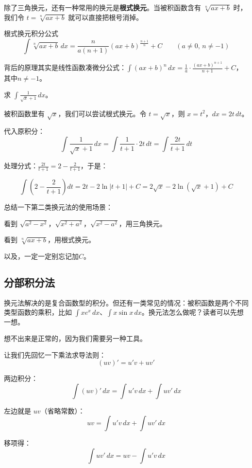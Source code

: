 除了三角换元，还有一种常用的换元是\textbf{根式换元}。当被积函数含有 $\sqrt[n]{ax+b}$ 时，我们令 $t = \sqrt[n]{ax+b}$ 就可以直接把根号消掉。

\begin{theorem}{根式换元积分公式}{}
  \[
\int \sqrt[n]{ax+b}\,dx = \frac{n}{a(n+1)}(ax+b)^{\frac{n+1}{n}} + C \qquad (a\neq 0,\, n\neq -1)
\]
\end{theorem}

背后的原理其实是线性函数凑微分公式：$\int (ax+b)^n \,dx = \frac{1}{a}\cdot\frac{(ax+b)^{n+1}}{n+1}+C$，其中$n\neq -1 $。

\begin{myexample}
  求 $\int \frac{1}{\sqrt{x} + 1}\, dx$。

  被积函数里有 $\sqrt{x}$，我们可以尝试根式换元。令 $t = \sqrt{x}$，则 $x = t^2$，$dx = 2t\, dt$。

  代入原积分：
  \[
  \int \frac{1}{\sqrt{x} + 1}\, dx = \int \frac{1}{t + 1} \cdot 2t\, dt = \int \frac{2t}{t+1}\, dt
  \]

  处理分式：$\frac{2t}{t+1} = 2 - \frac{2}{t+1}$，于是：

  \[
  \int (2 - \frac{2}{t+1}) dt = 2t - 2\ln|t+1| + C = 2\sqrt{x} - 2\ln(\sqrt{x}+1) + C
  \]

\end{myexample}

总结一下第二类换元法的使用场景：

看到 $\sqrt{a^2 - x^2}$，$\sqrt{x^2 + a^2}$，$\sqrt{x^2 - a^2}$，用三角换元。


看到 $\sqrt[n]{ax+b}$，用根式换元。


以及，一定一定别忘记加$C$。


\subsection{分部积分法}

换元法解决的是复合函数型的积分。但还有一类常见的情况：被积函数是两个不同类型函数的乘积，比如 $\int x e^x\,dx$、$\int x \sin x\,dx$。换元法怎么做呢？读者可以先想一想。

想不出来是正常的，因为我们需要另一种工具。

让我们先回忆一下乘法求导法则：
\[
(uv)' = u'v + uv'
\]

两边积分：
\[
\int (uv)'\, dx = \int u'v\, dx + \int uv'\, dx
\]

左边就是 $uv$（省略常数）：
\[
uv = \int u'v\, dx + \int uv'\, dx
\]

移项得：
\[
\int uv'\, dx = uv - \int u'v\, dx
\]

